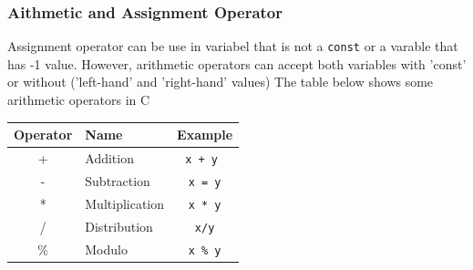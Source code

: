 \subsubsection{Aithmetic and Assignment Operator }
Assignment operator can be use in variabel that is not a \verb*|const| or a varable that has -1 value. However, arithmetic operators can accept both variables with 'const' or without ('left-hand' and 'right-hand' values)
The table below shows some arithmetic operators in C
\begin{center}
	\begin{tabular}{|c|l|c|}
		\hline

		\multicolumn{1}{|l|}{Operator} & Name           & \multicolumn{1}{l|}{Example} \\ \hline


		+                              & Addition       & \verb|x + y |                \\ \hline
		-                              & Subtraction    & \verb|x = y|                 \\ \hline
		*                              & Multiplication & \verb|x * y|                 \\ \hline
		/                              & Distribution   & \verb|x/y|                   \\ \hline
		\%                             & Modulo         & \verb|x % y|                 \\ \hline
	\end{tabular}
\end{center}

